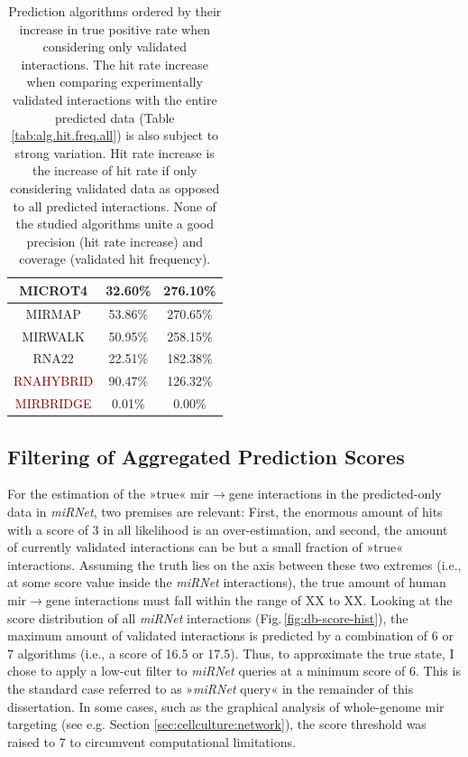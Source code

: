 \begin{table}
{\begin{tabular}{c | c | c}
\textcolor{OliveGreen}{MICROT4} & 32.60\% & 276.10\%\\ \hline
\textcolor{OliveGreen}{MIRMAP} & 53.86\% & 270.65\%\\ \hline
\textcolor{OliveGreen}{MIRWALK} & 50.95\% & 258.15\%\\ \hline
\textcolor{OliveGreen}{RNA22} & 22.51\% & 182.38\%\\ \hline
\textcolor{Maroon}{RNAHYBRID} & 90.47\% & 126.32\%\\ \hline
\textcolor{Maroon}{MIRBRIDGE} & 0.01\% & 0.00\%\\ \hline
\end{tabular}
\caption{Prediction algorithms ordered by their increase in true positive rate when considering only validated interactions. The hit rate increase when comparing experimentally validated interactions with the entire predicted data (Table \ref{tab:alg.hit.freq.all}) is also subject to strong variation. Hit rate increase is the increase of hit rate if only considering validated data as opposed to all predicted interactions. None of the studied algorithms unite a good precision (hit rate increase) and coverage (validated hit frequency).}
\label{tab:alg.hit.freq.val}
}
\end{table}

\subsection{Filtering of Aggregated Prediction Scores}
For the estimation of the »true« \ac{mir}$\to$gene interactions in the predicted-only data in \textit{miRNet}, two premises are relevant: First, the enormous amount of hits with a score of 3 in all likelihood is an over-estimation, and second, the amount of currently validated interactions can be but a small fraction of »true« interactions. Assuming the truth lies on the axis between these two extremes (i.e., at some score value inside the \textit{miRNet} interactions), the true amount of human \ac{mir}$\to$gene interactions must fall within the range of XX to XX. Looking at the score distribution of all \textit{miRNet} interactions (Fig.\,\ref{fig:db-score-hist}), the maximum amount of validated interactions is predicted by a combination of 6 or 7 algorithms (i.e., a score of 16.5 or 17.5). Thus, to approximate the true state, I chose to apply a low-cut filter to \textit{miRNet} queries at a minimum score of 6. This is the standard case referred to as »\textit{miRNet} query« in the remainder of this dissertation. In some cases, such as the graphical analysis of whole-genome \ac{mir} targeting (see e.g. Section \ref{sec:cellculture:network}), the score threshold was raised to 7 to circumvent computational limitations.

